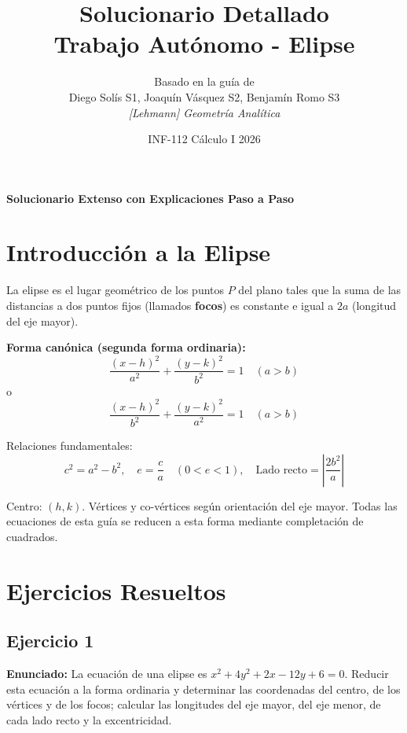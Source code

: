 \documentclass[12pt,a4paper]{article}
\title{\textbf{\Huge Solucionario Detallado \\ Trabajo Autónomo - Elipse}}
\author{
Basado en la guía de \\ Diego Solís S1, Joaquín Vásquez S2, Benjamín Romo S3 \\
\textit{[Lehmann] Geometría Analítica}
}
\date{INF-112 Cálculo I 2026}
\begin{document}
\maketitle
\thispagestyle{empty}

\vspace{2cm}
\begin{center}
    \Large\textbf{Solucionario Extenso con Explicaciones Paso a Paso}
\end{center}

\newpage
\tableofcontents
\newpage

\section{Introducción a la Elipse}
La elipse es el lugar geométrico de los puntos \(P\) del plano tales que la suma de las distancias a dos puntos fijos (llamados \textbf{focos}) es constante e igual a \(2a\) (longitud del eje mayor).

\textbf{Forma canónica (segunda forma ordinaria):}
\[
\frac{(x-h)^2}{a^2} + \frac{(y-k)^2}{b^2} = 1 \quad (a > b)
\]
o
\[
\frac{(x-h)^2}{b^2} + \frac{(y-k)^2}{a^2} = 1 \quad (a > b)
\]

Relaciones fundamentales:
\[
c^2 = a^2 - b^2, \quad e = \frac{c}{a} \quad (0 < e < 1), \quad \text{Lado recto} = \left| \frac{2b^2}{a} \right|
\]

Centro: \((h,k)\). Vértices y co-vértices según orientación del eje mayor.  
Todas las ecuaciones de esta guía se reducen a esta forma mediante completación de cuadrados.

\newpage
\section{Ejercicios Resueltos}

\subsection{Ejercicio 1}
\textbf{Enunciado:} La ecuación de una elipse es \(x^2 + 4y^2 + 2x - 12y + 6 = 0\). Reducir esta ecuación a la forma ordinaria y determinar las coordenadas del centro, de los vértices y de los focos; calcular las longitudes del eje mayor, del eje menor, de cada lado recto y la excentricidad.
\end{document}

